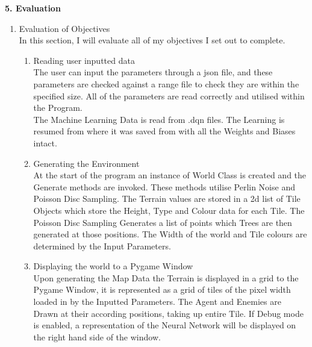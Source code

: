 \begin{flushleft}
    \huge
    \textbf{5. Evaluation}
    \vspace{0.1cm}

    \large
    \begin{enumerate}
        \item {\Large Evaluation of Objectives} \\
            \vspace{0.2cm}
            In this section, I will evaluate all of my objectives I set out to complete.
            \vspace{0.2cm}

            \begin{enumerate}
                \item Reading user inputted data \\
                    \vspace{0.2cm}
                    The user can input the parameters through a json file, and these parameters are checked against a range file to check they are within
                    the specified size. All of the parameters are read correctly and utilised within the Program. \\
                    \vspace{0.2cm}
                    The Machine Learning Data is read from .dqn files. The Learning is resumed from where it was saved from with all the Weights and
                    Biases intact. \\

                    \vspace{0.5cm}    
                \item Generating the Environment \\
                    \vspace{0.2cm}
                    At the start of the program an instance of World Class is created and the Generate methods are invoked. These methods utilise Perlin
                    Noise and Poisson Disc Sampling. The Terrain values are stored in a 2d list of Tile Objects which store the Height, Type and Colour data
                    for each Tile. The Poisson Disc Sampling Generates a list of points which Trees are then generated at those positions. The Width
                    of the world and Tile colours are determined by the Input Parameters. \\

                    \vspace{0.5cm}    
                \item Displaying the world to a Pygame Window \\
                    \vspace{0.2cm}
                    Upon generating the Map Data the Terrain is displayed in a grid to the Pygame Window, it is represented as a grid of tiles of the pixel 
                    width loaded in by the Inputted Parameters. The Agent and Enemies are Drawn at their according positions, taking up entire Tile. If Debug
                    mode is enabled, a representation of the Neural Network will be displayed on the right hand side of the window. \\


\end{enumerate}
\end{enumerate}
\end{flushleft}
